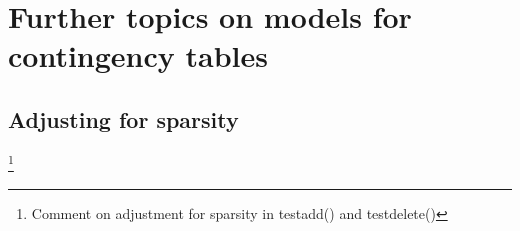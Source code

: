 \documentclass[12pt]{article}
\begin{document}
\section{Further topics on models for contingency tables}
\label{sec:xxx}


\subsection{Adjusting for sparsity}
\label{sec:xxx}

\footnote{Comment on adjustment for sparsity in testadd() and testdelete()}











\end{document}
